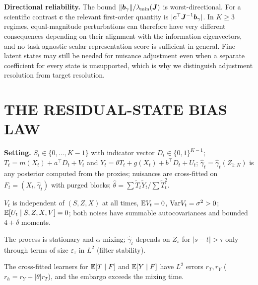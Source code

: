 \textbf{Directional reliability.} The bound $\|\boldsymbol b_\gamma\|/\lambda_{\min}(\boldsymbol{J})$ is worst-directional. For a scientific contrast $\boldsymbol c$ the relevant first-order quantity is $|\boldsymbol c^\top\boldsymbol{J}^{-1}\boldsymbol b_\gamma|$. In $K\ge3$ regimes, equal-magnitude perturbations can therefore have very different consequences depending on their alignment with the information eigenvectors, and no task-agnostic scalar representation score is sufficient in general. Fine latent states may still be needed for nuisance adjustment even when a separate coefficient for every state is unsupported, which is why we distinguish adjustment resolution from target resolution.

\section{THE RESIDUAL-STATE BIAS LAW}
\label{app:biaslaw}
\textbf{Setting.} $S_t\in\{0,\dots,K-1\}$ with indicator vector $D_t\in\{0,1\}^{K-1}$; $T_t=m(X_t)+a^\top D_t+V_t$ and $Y_t=\theta T_t+g(X_t)+b^\top D_t+U_t$; $\hat\gamma_t=\hat\gamma_t(Z_{1:N})$ is any posterior computed from the proxies; nuisances are cross-fitted on $F_t=(X_t,\hat\gamma_t)$ with purged blocks; $\hat\theta=\sum\tilde T_t\tilde Y_t/\sum\tilde T_t^2$.
\begin{assumption}\label{as:noise} $V_t$ is independent of $(S,Z,X)$ at all times, $\mathbb{E} V_t=0$, $\mathrm{Var} V_t=\sigma^2>0$; $\mathbb{E}[U_t\mid S,Z,X,V]=0$; both noises have summable autocovariances and bounded $4{+}\delta$ moments.\end{assumption}
\begin{assumption}\label{as:post} The process is stationary and $\alpha$-mixing; $\hat\gamma_t$ depends on $Z_s$ for $|s-t|>\tau$ only through terms of size $\varepsilon_\tau$ in $L^2$ (filter stability).\end{assumption}
\begin{assumption}\label{as:nuis} The cross-fitted learners for $\mathbb{E}[T\mid F]$ and $\mathbb{E}[Y\mid F]$ have $L^2$ errors $r_T,r_Y$ ($r_h=r_Y+|\theta|r_T$), and the embargo exceeds the mixing time.\end{assumption}

